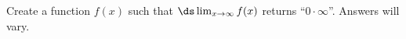 {Create a function $f(x)$ such that $\ds \lim_{x\to \infty}f(x)$ returns ``$0\cdot\infty$''.}
{Answers will vary.}
